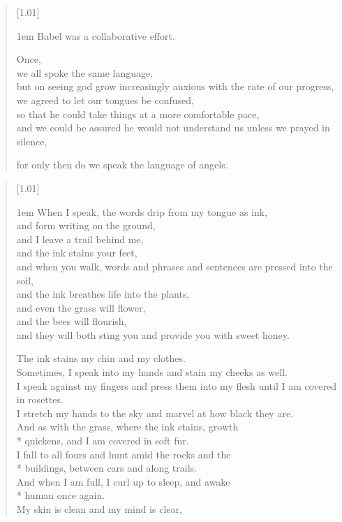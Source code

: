 \begin{paracol}{2}
\null
\vfill
\begin{verse}[1.01\textwidth]
    {\vgap1em
    Babel was a collaborative effort.

    Once,\\
    we all spoke the same language,\\
    \vin but on seeing god grow increasingly anxious with the rate of our progress,\\
    \vin \vin we agreed to let our tongues be confused,\\
    \vin \vin \vin so that he could take things at a more comfortable pace,\\
    \vin \vin \vin \vin and we could be assured he would not understand us \mbox{unless} we prayed in silence,

    for only then do we speak the language of angels.}
\end{verse}
\vfill
\newpage

\null
\vfill
\begin{verse}[1.01\textwidth]
    {\vgap1em
    When I speak, the words drip from my tongue as ink,\\
    and form writing on the ground,\\
    and I leave a trail behind me,\\
    and the ink stains your feet,\\
    and when you walk, words and phrases and sentences are pressed into the soil,\\
    and the ink breathes life into the plants,\\
    and even the grass will flower,\\
    and the bees will flourish,\\
    and they will both sting you and provide you with sweet honey.

    The ink stains my chin and my clothes.\\
    \vin Sometimes, I speak into my hands and stain my cheeks as well.\\
    \vin \vin I speak against my fingers and press them into my flesh until I am covered in rosettes.\\
    \vin \vin \vin I stretch my hands to the sky and marvel at how black they are.\\
    \vin \vin \vin \vin And as with the grass, where the ink stains, growth\\*
    \vin \vin \vin \vin quickens, and I am covered in soft fur.\\
    \vin \vin \vin \vin \vin I fall to all fours and hunt amid the rocks and the\\*
    \vin \vin \vin \vin \vin buildings, between cars and along trails.\\
    \vin \vin \vin \vin \vin \vin And when I am full, I curl up to sleep, and awake\\*
    \vin \vin \vin \vin \vin \vin human once again.\\
    \vin \vin \vin \vin \vin \vin \vin My skin is clean and my mind is clear,

}
\end{verse}
\end{paracol}
